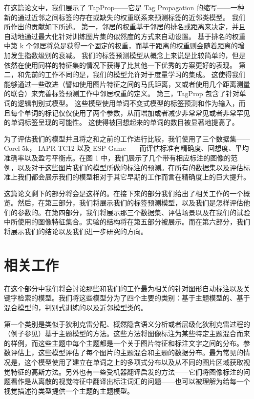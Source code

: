 \documentclass[a4paper,twocolumn]{ctexart}
\begin{document}
在这篇论文中，我们展示了 TapProp——它是 Tag Propagation 的缩写——一种新的通过近邻之间标签的存在或缺失的权重联系来预测标签的近邻类模型。
我们所作出的贡献如下所述。
第一，邻居的权重基于邻居的排名或距离来决定，并且自动地通过最大化针对训练图片集的似然度的方式来自动设置。
基于排名的权重中第 k 个邻居将总是获得一个固定的权重，而基于距离的权重则会随着距离的增加发生指数级别的衰减。
我们的标签预测模型从概念上来说是比较简单的，但是依然在使用同样的特征集的情况下获得了比其他一下优秀的方案更好的表现。
第二，和先前的工作不同的是，我们的模型允许对于度量学习的集成。
这使得我们能够通过一些改进（譬如使用图片特征之间的马氏距离，又或者使用几个距离测量的联合）来完善标签预测工作中邻居权重的定义。
第三，TagProp 包含了针对单词的逻辑判别式模型。
这些模型使用单词不变式模型的标签预测和作为输入，而且每个单词的标记仅仅使用了两个参数，从而增加或者减少非常常见或者非常罕见的单词标签呈现的可能性。
这使得被回想起来的单词的数目被显著地提高了。

为了评估我们的模型并且将之和之前的工作进行比较，我们使用了三个数据集—— Corel 5k， IAPR TC12 以及 ESP Game——而评估标准有精确度、回想度、平均准确率以及盈亏平衡点。在图 1 中，我们展示了几个带有相应标注的图像的范例，以及对于这些图片我们的模型所做的标注的预测。在所有的数据集以及评估标准上我们都会展示我们的模型相对于其它早期的工作而言在精确度上的巨大提升。

这篇论文剩下的部分将会是这样的。在接下来的部分我们给出了相关工作的一个概览。然后，在第三部分，我们将展示我们的标签预测模型，以及我们是怎样评估他们的参数的。在第四部分，我们将展示那三个数据集、评估场景以及在我们的试验中所使用的图像特征集合。实验的结构将在第五部分被展示。而在第六部分，我们将展示我们的结论以及我们进一步研究的方向。

\section{相关工作}

在这个部分中我们将会讨论那些和我们的工作最为相关的针对图形自动标注以及关键字检索的模型。我们将这些模型分为了四个主要的类别：基于主题模型的、基于混合模型的，判别式训练的以及近邻模型类的。

第一个类别是类似于狄利克雷分配、概然隐含语义分析或者层级化狄利克雷过程的（例子参见\cite{1,20,25}）基于主题模型的方法。这些方法将图像标注为某些特定主题混合而来的样例，而这些主题中每个主题都是一个关于图片特征和标注文字之间的分布。参数评估上，这些模型评估了每个图片的主题混合和主题的数据分布。最为常见的情况是，这个模型使用了建立在单词之上的多项式分布以及从不同的图片区域获取视觉特征的高斯方法。另外也有一些受机器翻译启发的方法\cite{4}——它们将图像标注的问题看作是从离散的视觉特征中翻译出标注词汇的问题——也可以被理解为给每一个视觉描述符类型提供一个主题的主题模型。
\end{document}
